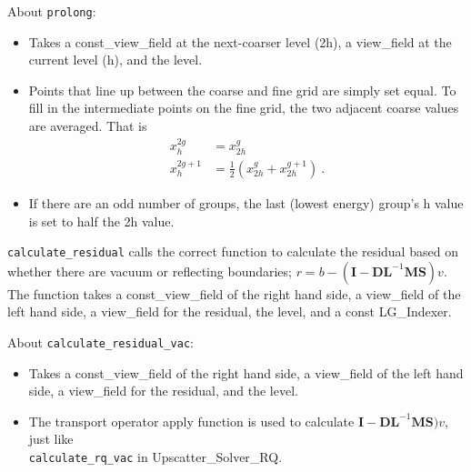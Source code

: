 \documentclass[12pt, letterpaper]{article}
\newcommand{\ve}[1]{\ensuremath{\mathbf{#1}}}
\begin{document}
\noindent About \verb+prolong+:
\begin{itemize}
  \item Takes a const\_view\_field at the next-coarser level (2h), a view\_field at the current level (h), and the level.
  \item Points that line up between the coarse and fine grid are simply set equal. To fill in the intermediate points on the fine grid, the two adjacent coarse values are averaged. That is
  \begin{align}
    x_{h}^{2g} &= x_{2h}^{g} \nonumber \\
    x_{h}^{2g+1} &= \frac{1}{2}(x_{2h}^{g} + x_{2h}^{g+1}) \nonumber \:.
  \end{align}
  \item If there are an odd number of groups, the last (lowest energy) group's h value is set to half the 2h value.
\end{itemize}
 
\noindent \verb+calculate_residual+ calls the correct function to calculate the residual based on whether there are vacuum or reflecting boundaries; $r = b - (\ve{I} - \ve{DL}^{-1}\ve{MS})v$. The function takes a const\_view\_field of the right hand side, a view\_field of the left hand side, a view\_field for the residual, the level, and a const LG\_Indexer.

About \verb+calculate_residual_vac+:
\begin{itemize}
  \item Takes a const\_view\_field of the right hand side, a view\_field of the left hand side, a view\_field for the residual, and the level.
  \item The transport operator apply function is used to calculate $\ve{I} - \ve{DL}^{-1}\ve{MS})v$, just like \\ \verb+calculate_rq_vac+ in Upscatter\_Solver\_RQ.
\end{itemize}
\end{document}
